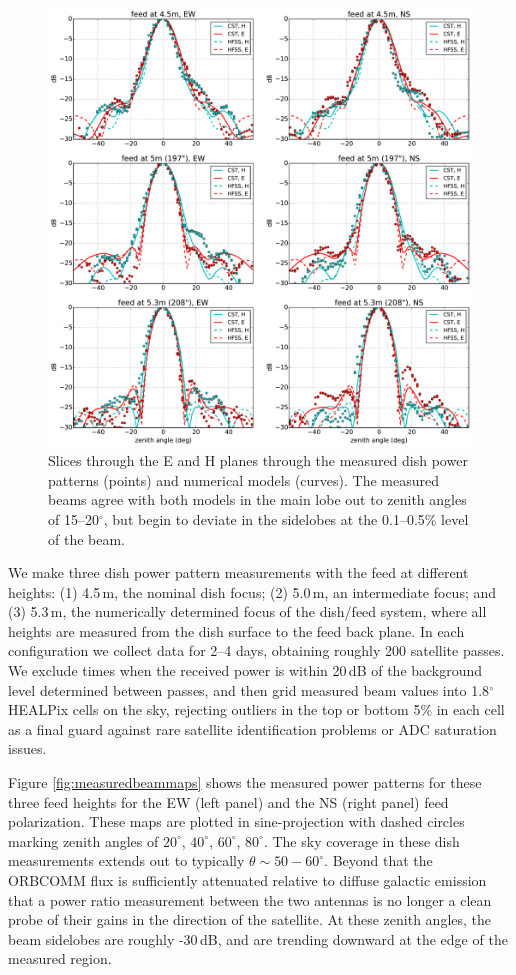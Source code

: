 \documentclass{emulateapj}
\begin{document}
\begin{figure}[t]
\centering
\includegraphics[width=6.5in]{measured_beams_and_models_slices.pdf}
\caption{Slices through the E and H planes through the measured dish power patterns (points) and numerical models (curves). The measured beams agree with both models in the main lobe out to zenith angles of 15--20$^\circ$, but begin to deviate in the sidelobes at the 0.1--0.5\% level of the beam.}
\label{fig:measuredbeamslices}
\end{figure}

We make three dish power pattern measurements with the feed at different heights: (1) 4.5\,m, the nominal dish focus; (2) 5.0\,m, an intermediate focus; and (3) 5.3\,m, the numerically determined focus of the dish/feed system, where all heights are measured from the dish surface to the feed back plane. In each configuration we collect data for 2--4 days, obtaining roughly 200 satellite passes. We exclude times when the received power is within 20\,dB of the background level determined between passes, and then grid measured beam values into 1.8$^\circ$ HEALPix cells on the sky, rejecting outliers in the top or bottom 5\% in each cell as a final guard against rare satellite identification problems or ADC saturation issues.

Figure \ref{fig:measuredbeammaps} shows the measured power patterns for these three feed heights for the EW (left panel) and the NS (right panel) feed polarization. These maps are plotted in sine-projection with dashed circles marking zenith angles of $20^\circ$, $40^\circ$, $60^\circ$, $80^\circ$. The sky coverage in these dish measurements extends out to typically $\theta\sim50-60^\circ$. Beyond that the ORBCOMM flux is sufficiently attenuated relative to diffuse galactic emission that a power ratio measurement between the two antennas is no longer a clean probe of their gains in the direction of the satellite. At these zenith angles, the beam sidelobes are roughly -30\,dB, and are trending downward at the edge of the measured region.
\end{document}
